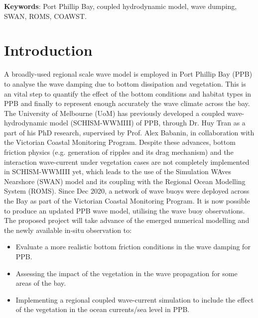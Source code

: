 \documentclass[12pt]{article}
\begin{document}
\noindent
\textbf{Keywords}: Port Phillip Bay, coupled hydrodynamic model, wave dumping, SWAN, ROMS, COAWST.


\newpage

\tableofcontents

\newpage

\listoffigures

\newpage

\hypersetup{
    colorlinks=true,
    linkcolor=blue,
    urlcolor=blue,
    }

\section{Introduction}

A broadly-used regional scale wave model is employed in Port Phillip Bay (PPB) to analyse the wave damping due to bottom dissipation and vegetation. This is an vital step to quantify the effect of the bottom conditions and habitat types in PPB and finally to represent enough accurately the wave climate across the bay. The University of Melbourne (UoM) has previously developed a coupled wave-hydrodynamic model (SCHISM-WWMIII) of PPB, through Dr. Huy Tran as a part of his PhD research, supervised by Prof. Alex Babanin, in collaboration with the Victorian Coastal Monitoring Program. Despite these advances, bottom friction physics (e.g. generation of ripples and its drag mechanism) and the interaction wave-current under vegetation cases are not completely implemented in SCHISM-WWMIII yet, which leads to the use of the Simulation WAves Nearshore (SWAN) model and its coupling with the Regional Ocean Modelling System (ROMS). Since Dec 2020, a network of wave buoys were deployed across the Bay as part of the Victorian Coastal Monitoring Program. It is now possible to produce an updated PPB wave model, utilising the wave buoy observations. The proposed project will take advance of the emerged numerical modelling and the newly available in-situ observation to:

\begin{itemize}
    \item Evaluate a more realistic bottom friction conditions in the wave damping for PPB.
    \item Assessing the impact of the vegetation in the wave propagation for some areas of the bay.
    \item Implementing a regional coupled wave-current simulation to include the effect of the vegetation in the ocean currents/sea level in PPB.
\end{itemize}
\end{document}
